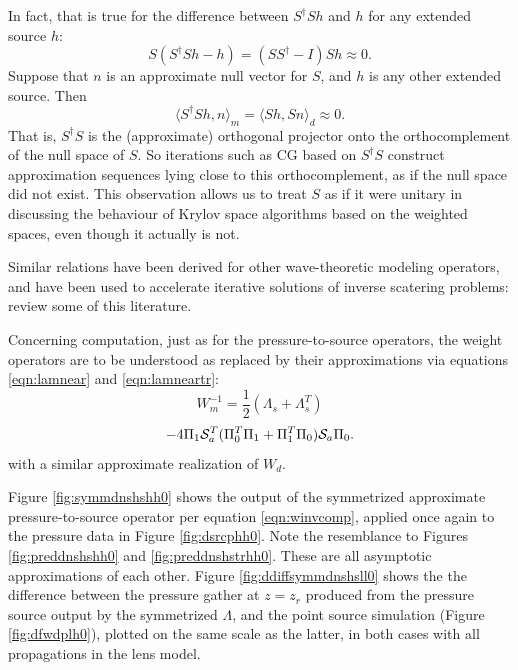 \documentclass[georeport,12pt]{geophysics}
\begin{document}
In fact, that is true for the difference between $S^{\dagger}Sh$ and
$h$ for any extended source $h$:
\[
  S(S^{\dagger}Sh - h) = (SS^{\dagger}-I)Sh \approx 0.
\]
Suppose that $n$ is an approximate null vector for $S$, and $h$ is any
other extended source. Then
\[
  \langle S^{\dagger}S h, n \rangle_m = \langle Sh, Sn \rangle_d
  \approx 0.
\]
That is, $S^{\dagger}S$ is the (approximate) orthogonal projector onto
the orthocomplement of the null space of $S$. So iterations such as CG
based on $S^{\dagger}S$ construct approximation sequences lying close
to this orthocomplement, as if the null space did not exist. This
observation allows us to treat $S$ as if it were unitary in discussing
the behaviour of Krylov space algorithms based on the weighted spaces,
even though it actually is not.

Similar relations have been derived for other wave-theoretic modeling operators,
and have been used to accelerate iterative solutions of inverse
scatering problems: \cite{DafniSymes:SEG18b} review some of this
literature.

Concerning computation, just as for the pressure-to-source operators,
the weight operators are to be understood as replaced by their
approximations via equations \ref{eqn:lamnear} and \ref{eqn:lamneartr}:
\[
W_m^{-1} = \frac{1}{2}(\Lambda_s +
\Lambda_s^T)
\]
\begin{equation}
  \label{eqn:winvcomp}
  -4\Pi_1 {\cal S}_a^T(\Pi_0^T\Pi_1+ \Pi_1^T\Pi_0){\cal S}_a\Pi_0.
\end{equation}
with a similar approximate realization of $W_d$.

Figure \ref{fig:symmdnshshh0} shows the output of the symmetrized
approximate pressure-to-source operator per equation \ref{eqn:winvcomp},
applied once again to the pressure data in Figure
\ref{fig:dsrcphh0}. Note the resemblance to Figures
\ref{fig:preddnshshh0} and \ref{fig:preddnshstrhh0}. These are all
asymptotic approximations of each other. Figure
\ref{fig:ddiffsymmdnshsll0} shows the
 the difference between the pressure gather at $z=z_r$ produced from
 the pressure source output by the symmetrized $\Lambda$, and the point source
simulation (Figure \ref{fig:dfwdplh0}), plotted on the same scale as
the latter, in both cases with all propagations in the lens model.
\end{document}

